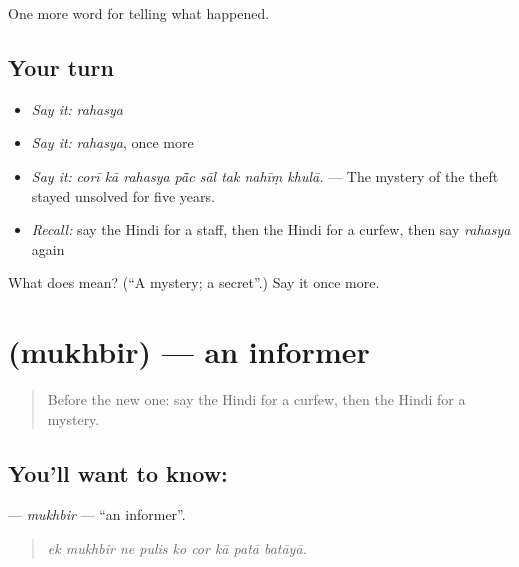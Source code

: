 \begin{grammarlens}[title={What you've built}]
One more word for telling what happened.
\end{grammarlens}

\subsection*{Your turn}
\begin{itemize}
\raggedright
  \item \emph{Say it:} \emph{rahasya}
  \item \emph{Say it:} \emph{rahasya}, once more
  \item \emph{Say it:} \emph{corī kā rahasya pā̃c sāl tak nahīṃ khulā.} — The mystery of the theft stayed unsolved for five years.
  \item \emph{Recall:} say the Hindi for a staff, then the Hindi for a curfew, then say \emph{rahasya} again
\end{itemize}

\begin{tcolorbox}[breakable,colback=teal!4,colframe=teal!35!black,title={Before you move on}]
What does  mean? (\textquotedblleft{}A mystery; a secret\textquotedblright{}.) Say it once more.
\end{tcolorbox}
\section[\texorpdfstring{\hi{मुखबिर} (mukhbir)}{मुखबिर (mukhbir)}]{ (mukhbir) — an informer}

\label{lesson:HI-C317-mukhbir}



\begin{quote}
Before the new one: say the Hindi for a curfew, then the Hindi for a mystery.
\end{quote}

\subsection*{You'll want to know: }
\textbf{} — \emph{mukhbir} — \textquotedblleft{}an informer\textquotedblright{}.

\begin{quote}
        
\end{quote}

\begin{quote}
\emph{ek mukhbir ne pulis ko cor kā patā batāyā.}
\end{quote}

